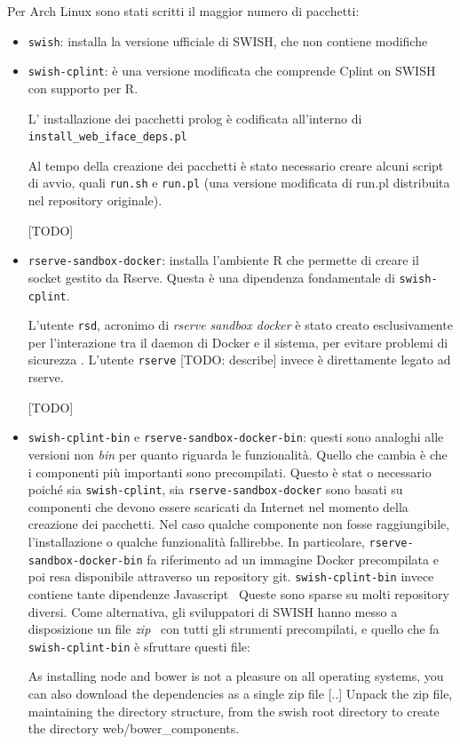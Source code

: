 \documentclass[10pt,titlepage,twoside,a4paper]{report}
\begin{document}
Per Arch Linux sono stati scritti il maggior numero di pacchetti:
\begin{itemize}
    \item \texttt{swish}: installa la versione ufficiale di SWISH, che non 
contiene modifiche
    \item \texttt{swish-cplint}: è una versione modificata che comprende 
Cplint on SWISH con supporto per R.

L' installazione dei pacchetti prolog è codificata all'interno di 
\texttt{install\_web\_iface\_deps.pl}

Al tempo della creazione dei pacchetti è stato necessario creare alcuni
script di avvio, quali \texttt{run.sh} e \texttt{run.pl} (una versione 
modificata di run.pl distribuita nel repository originale).

[TODO]

    \item \texttt{rserve-sandbox-docker}: installa l'ambiente R che permette di 
creare il socket gestito da Rserve. Questa è una dipendenza fondamentale di 
\texttt{swish-cplint}.

L'utente \texttt{rsd}, acronimo di \emph{rserve sandbox docker} è stato creato
esclusivamente per l'interazione tra il daemon di Docker e il sistema, per 
evitare problemi di sicurezza \cite{dockerPrivilegeEscalation0} 
\cite{dockerPrivilegeEscalation1}. L'utente \texttt{rserve} [TODO: describe] 
invece è direttamente legato ad rserve.

[TODO]

    \item \texttt{swish-cplint-bin} e \texttt{rserve-sandbox-docker-bin}: 
questi sono analoghi alle versioni non \emph{bin} per quanto riguarda le 
funzionalità. Quello che cambia è che i componenti più importanti sono 
precompilati. Questo è stat o necessario poiché sia \texttt{swish-cplint}, 
sia \texttt{rserve-sandbox-docker} sono basati su componenti che devono essere 
scaricati da Internet nel momento della creazione dei pacchetti. Nel caso 
qualche componente non fosse raggiungibile, l'installazione o qualche 
funzionalità fallirebbe. In particolare, \texttt{rserve-sandbox-docker-bin} 
fa riferimento ad un immagine Docker precompilata e poi resa disponibile 
attraverso un repository git. \texttt{swish-cplint-bin} invece contiene tante 
dipendenze Javascript~\cite{javascriptDepsSWISH} Queste sono sparse su molti 
repository diversi. Come alternativa, gli sviluppatori 
di SWISH hanno messo a disposizione un file \emph{zip}~\cite{swishWebDepsZip} 
con tutti gli strumenti precompilati, e quello che fa \texttt{swish-cplint-bin}
è sfruttare questi file:
\begin{displayquote}
As installing node and bower is not a pleasure on all operating systems,
you can also download the dependencies as a single zip file [..]
Unpack the zip file, maintaining the directory structure, from the swish
root directory to create the directory web/bower\_components.
\end{displayquote}
\end{itemize}
\end{document}
